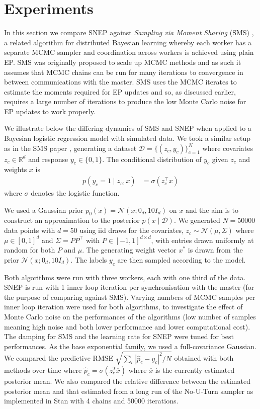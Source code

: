 \section{Experiments}
In this section we compare SNEP against 
\emph{Sampling via Moment Sharing} (SMS) \citep{xu14}, a related algorithm for distributed Bayesian learning whereby each worker has a separate MCMC sampler and coordination across workers is achieved using plain EP. SMS was originally proposed to scale up MCMC methods and as such it assumes that MCMC chains can be run for many iterations to convergence in between communications with the master.  SMS uses the MCMC iterates to estimate the moments required for EP updates and so, as discussed earlier, requires a large number of iterations to produce the low Monte Carlo noise for EP updates to work properly.

We illustrate below the differing dynamics of SMS and SNEP when applied to a Bayesian logistic regression model with simulated data.  We took a  similar setup as in the SMS paper \citep{xu14}, generating a dataset $\mathcal D=\{( z_{c},y_{c})\}_{c=1}^{N}$ where covariates $ z_{c}\in\mathbb R^{d}$ and response $y_{c}\in\{0,1\}$. The conditional distribution of $y_{c}$ given $ z_{c}$ and weights $ x$ is
\begin{align}
	p(y_{c}=1 \mid  z_{c}, x) &= \sigma( z_{c}^{\top} x)	
\end{align}
where $\sigma$ denotes the logistic function. 

We used a Gaussian prior $p_{0}( x)=\mathcal N( x; 0_{d},10 I_{d})$ on $ x$ and the aim is to construct an approximation to the posterior $p( x \mid \mathcal D)$. We generated $N=50000$ data points  with $d=50$ using iid draws for the covariates, $z_c\sim \mathcal N(\mu,\Sigma)$ where $\mu\in[0,1]^{d}$ and $\Sigma=PP^{\top}$ with $P\in[-1,1]^{d\times d}$, with entries drawn uniformly at random for both $P$ and $\mu$. The generating weight vector $ x^*$ is drawn from the prior $\mathcal N( x; 0_{d},10 I_{d})$. The labels $y_{c}$ are then sampled according to the model. 

%
%
Both algorithms were run with three workers, each with one third of the data. SNEP is run with 1 inner loop iteration per synchronisation with the master (for the purpose of comparing against SMS).  Varying numbers of MCMC samples per inner loop iteration were used for both algorithms, to investigate the effect of Monte Carlo noise on the performances of the algorithms (low number of samples meaning high noise and both lower performance and lower computational cost).   The damping for SMS and the learning rate for SNEP were tuned for best performances. As the base exponential family, we used a full-covariance Gaussian.  
We compared the predictive RMSE $\sqrt{\sum_{c}|\hat{p}_{c}- y_{c}|^{2}/N}$ obtained with both methods over time where $\hat{p}_{c}=\sigma( z_{c}^{T}\overline{ x})$ where $\overline{ x}$ is the currently estimated posterior mean. We also compared the relative difference between the estimated posterior mean and that estimated from a long run of the No-U-Turn sampler \citep{hoffman14} as implemented in Stan \citep{carpenter16} with 4 chains and 50000 iterations.

